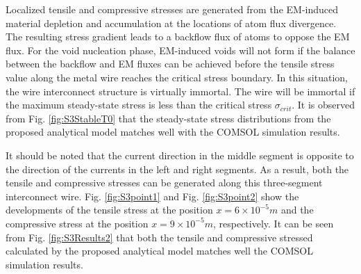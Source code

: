 Localized tensile and compressive stresses are generated from the EM-induced material depletion and accumulation at the locations of atom flux divergence. The resulting stress gradient leads to a backflow flux of atoms to oppose the EM flux. For the void nucleation phase, EM-induced voids will not form if the balance between the backflow and EM fluxes can be achieved before the tensile stress value along the metal wire reaches the critical stress boundary. In this situation, the wire interconnect structure is virtually immortal. The wire will be immortal if the maximum steady-state stress is less than the critical stress $\sigma_{crit}$. It is observed from Fig. \ref{fig:S3StableT0} that the steady-state stress distributions from the proposed analytical model matches well with the COMSOL simulation results.

It should be noted that the current direction in the middle segment is opposite to the direction of the currents in the left and right segments. As a result, both the tensile and compressive stresses can be generated along this three-segment interconnect wire. Fig. \ref{fig:S3point1} and Fig. \ref{fig:S3point2} show the developments of the tensile stress at the position $x=6\times 10^{-5}m$ and the compressive stress at the position $x=9\times 10^{-5}m$, respectively. It can be seen from Fig. \ref{fig:S3Results2} that both the tensile and compressive stressed calculated by the proposed analytical model matches well the COMSOL simulation results.


